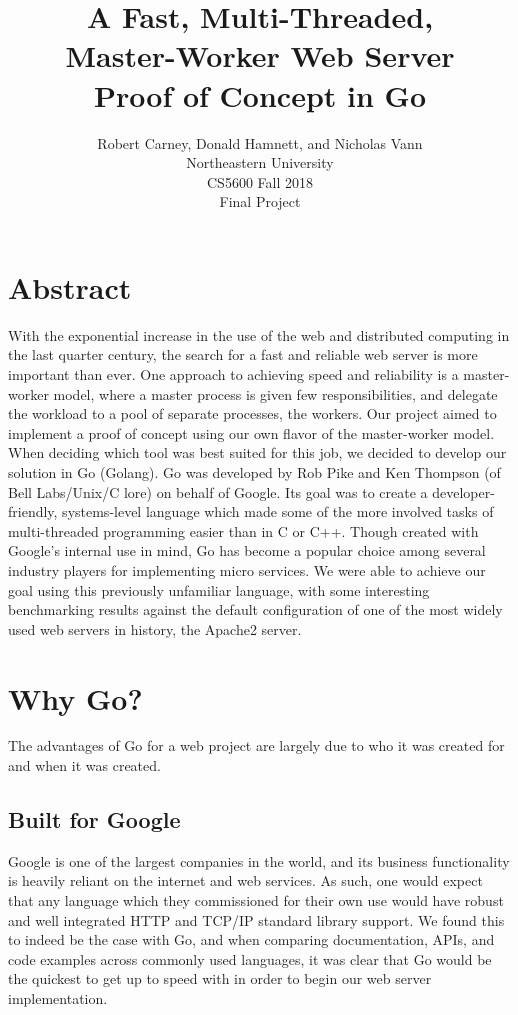 \documentclass[10pt]{article}
\begin{document}
\title{
  A Fast, Multi-Threaded, \\
  Master-Worker Web Server \\
  \Large Proof of Concept in Go
}
  
\author{
  Robert Carney, Donald Hamnett, and Nicholas Vann \\
  Northeastern University \\
  CS5600 Fall 2018 \\
  Final Project 
}
\maketitle
\section*{Abstract}
\begin{multicols}{2}

\par
With the exponential increase in the use of the web and distributed computing in the last quarter century, the search for a fast and reliable web server is more important than ever.  One approach to achieving speed and reliability is a master-worker model, where a master process is given few responsibilities, and delegate the workload to a pool of separate processes, the workers.  Our project aimed to implement a proof of concept using our own flavor of the master-worker model.  When deciding which tool was best suited for this job, we decided to develop our solution in Go (Golang). Go was developed by Rob Pike and Ken Thompson (of Bell Labs/Unix/C lore) on behalf of Google.  Its goal was to create a developer-friendly, systems-level language which made some of the more involved tasks of multi-threaded programming easier than in C or C++.  Though created with Google's internal use in mind, Go has become a popular choice among several industry players for implementing micro services. We were able to achieve our goal using this previously unfamiliar language, with some interesting benchmarking results against the default configuration of one of the most widely used web servers in history, the Apache2 server.
\section*{Why Go?}
\par
The advantages of Go for a web project are largely due to who it was created for and when it was created.  
\subsection*{Built for Google}
\par
Google is one of the largest companies in the world, and its business functionality is heavily reliant on the internet and web services.  As such, one would expect that any language which they commissioned for their own use would have robust and well integrated HTTP and TCP/IP standard library support.  We found this to indeed be the case with Go, and when comparing documentation, APIs, and code examples across commonly used languages, it was clear that Go would be the quickest to get up to speed with in order to begin our web server implementation.  

\end{multicols}
\end{document}
